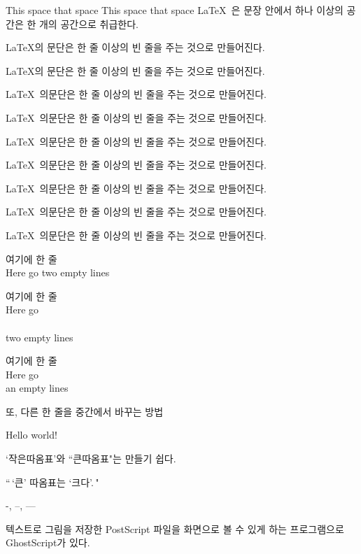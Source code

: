 \documentclass[11pt]{article}
\begin{document}
This space that space                  This space that    space
\LaTeX \       은 문장 안에서 하나   이상의 공간은
한 개의 공간으로 취급한다.

\LaTeX 의    문단은 한 줄 
이상의 빈 줄을 주는
것으로 만들어진다.

\setlength{\parindent}{5cm} \LaTeX 의    문단은 한 줄 
이상의 빈 줄을 주는
것으로 만들어진다.

\setlength{\parindent}{0cm}\LaTeX \ 의문단은 한 줄 이상의 빈 줄을 주는 것으로 만들어진다.

\LaTeX \ 의문단은 한 줄 이상의 빈 줄을 주는 것으로 만들어진다.

\setlength{\parindent}{5cm}
\LaTeX \ 의문단은 한 줄 이상의 빈 줄을 주는 것으로 만들어진다.

\LaTeX \ 의문단은 한 줄 이상의 빈 줄을 주는 것으로 만들어진다.

\noindent
\LaTeX \ 의문단은 한 줄 이상의 빈 줄을 주는 것으로 만들어진다.

\parskip=2cm
\parindent=1cm
\LaTeX \ 의문단은 한 줄 이상의 빈 줄을 주는 것으로 만들어진다.

\LaTeX \ 의문단은 한 줄 이상의 빈 줄을 주는 것으로 만들어진다.

여기에 \newline \newline 한 줄\\
Here go \newline \null
\newline two empty lines

여기에 \newline 한 줄 \\
Here go \\ \\
two empty lines

여기에 한 줄 \\[2cm]
Here go \\ an empty lines

또, 다른 한 줄을 \linebreak 중간에서 바꾸는 방법

\newpage \null
\newpage

Hello world!

\parskip=0.5cm

`작은따옴표'와 ``큰따옴표"는 만들기 쉽다.

``\,`큰' 따옴표는 `크다'.\,"

-, --, ---

텍스트로 그림을 저장한
Po\-st\-Script 파일을 화면으로
볼 수 있게 하는 프로그램으로
Gho\-st\-Script가 있다.
\end{document}
